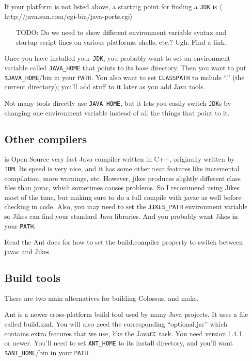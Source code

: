 \documentclass{article}
\begin{document}
If your platform is not listed above, a starting point for finding
a \texttt{JDK} is $\langle$http://java.sun.com/cgi-bin/java-ports.cgi$\rangle$

\begin{itemize}
\item[TODO:]  Do we need to show different environment variable syntax and
startup script lines on various platforms, shells, etc.?  Ugh.  Find
a link.
\end{itemize}

Once you have installed your \texttt{JDK}, you probably want to set an environment 
variable called \texttt{JAVA\_HOME} that points to its base directory.  Then you want 
to put \texttt{\$JAVA\_HOME}/bin in your \texttt{PATH}.  You also want to set \texttt{CLASSPATH} to 
include ``.'' (the current directory); you'll add stuff to it later as you 
add Java tools.

Not many tools directly use \texttt{JAVA\_HOME}, but it lets you easily switch \texttt{JDK}s 
by changing one environment variable instead of all the things that point 
to it.

\subsection{Other compilers}

 is Open Source very fast Java compiler written
in C++, originally
written by \texttt{IBM}.  Its speed is very nice, and it has some other neat 
features like incremental compilation, more warnings, etc.  However, 
jikes produces slightly different class files than javac, which 
sometimes causes problems.  So I recommend using Jikes most of the time,
but making sure to do a full compile with javac as well before checking
in code.
Also, you may need to set the \texttt{JIKES\_PATH} environment variable so Jikes 
can find your standard Java libraries.  And you probably want Jikes in
your \texttt{PATH}.

Read the Ant docs for how to set the build.compiler property to 
switch between javac and Jikes.

\subsection{Build tools}

There are two main alternatives for building Colossus,  and make.

Ant is a newer cross-platform build tool used by many Java projects.  
It uses a file called build.xml. You will also need the corresponding
``optional.jar'' which contains extra features that we use, like the 
Java\texttt{CC} task.  You need version 1.4.1 or newer.  You'll need to set 
\texttt{ANT\_HOME} to its install directory, and you'll want \texttt{\$ANT\_HOME}/bin in 
your \texttt{PATH}.
\end{document}

